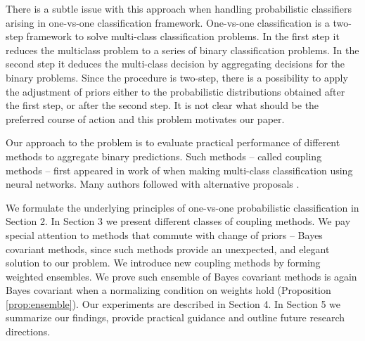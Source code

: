 There is a subtle issue with this approach  when handling probabilistic 
classifiers arising in one-vs-one classification framework.   
One-vs-one classification is a two-step framework to solve 
multi-class classification problems.
In the first step it reduces the multiclass problem to a series of binary
classification problems. 
In the second step it deduces the multi-class decision by aggregating decisions 
for the binary problems. Since the procedure is two-step, there is a possibility 
to apply the adjustment of priors either to the probabilistic distributions 
obtained after the first step, or after the second step. It is not clear what 
should be the preferred course of action and this problem motivates our paper. 


Our approach to the problem is to evaluate practical performance of different 
methods to aggregate binary predictions. Such methods -- called coupling methods
-- first appeared in work of \cite{refregier1991probabilistic} when making 
multi-class classification using neural networks. 
Many authors followed with alternative proposals 
\cite{price1994pairwise, hastie1998classification,  zahorian1999partitioned,
wu2004probability, vsuch2015new, vsuch2016bayes}.

We formulate the underlying principles of one-vs-one probabilistic classification in Section 2. In Section 3 we present  different classes of coupling methods. 
We pay special attention to methods that commute with change of priors -- Bayes covariant methods, 
since such methods provide an unexpected, and elegant solution to our problem. 
We introduce new coupling methods by forming weighted ensembles. We prove such ensemble of Bayes covariant methods is again Bayes covariant
when a normalizing condition on weights hold (Proposition \ref{prop:ensemble}).  
Our experiments are described in Section 4. In Section 5 we summarize our findings, 
provide practical guidance and outline future research directions.